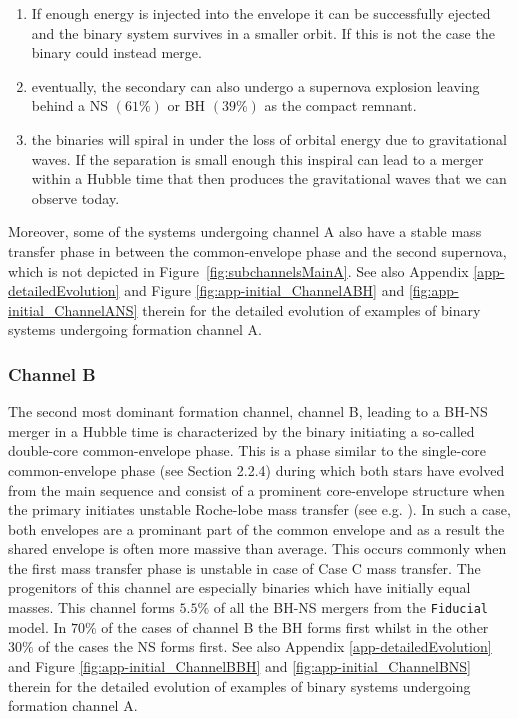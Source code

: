 \documentclass[a4paper,fleqn,usenatbib,useAMS,usedcolumn]{mnras}
\newcommand\Fiducial{\texttt{Fiducial }}
\begin{document}
\begin{enumerate}
	\item If enough energy is injected into the envelope it can be successfully ejected and the binary system survives in a smaller orbit. If this is not the case the binary could instead merge.  
	\item eventually, the secondary can also undergo a supernova explosion leaving behind a NS $(61 \%)$ or BH $(39 \%)$ as the compact remnant. 
	\item the binaries will spiral in under the loss of orbital energy due to gravitational waves. If the separation is small enough this inspiral can lead to a merger within a Hubble time that then produces the gravitational waves that we can observe today. 
\end{enumerate}

Moreover, some of the systems undergoing channel A also have a stable mass transfer phase in between the common-envelope phase and the second supernova, which is not depicted in Figure~\ref{fig:subchannelsMainA}. 
See also Appendix \ref{app-detailedEvolution}  and Figure \ref{fig:app-initial_ChannelABH} and \ref{fig:app-initial_ChannelANS} therein for the detailed evolution of examples of binary systems undergoing formation channel A.  \\





\subsubsection{Channel B}

The second most dominant formation channel, channel B, leading to a BH-NS merger in a Hubble time is characterized by the binary initiating a so-called double-core common-envelope phase. This is a phase similar to the single-core common-envelope phase (see Section 2.2.4) during which both stars have evolved from the main sequence and consist of a prominent core-envelope structure when the primary initiates unstable Roche-lobe mass transfer (see e.g. \citealt{1995ApJ...440..270B,Belczynski:2000wr, Dewi:2006bx}). In such a case, both envelopes are a prominant part of the common envelope and as a result the shared envelope is often more massive than average. This occurs commonly when the first mass transfer phase is unstable in case of Case C mass transfer. The progenitors of this channel are especially binaries  which have initially equal masses. This channel forms $5.5\%$ of all the BH-NS mergers from the \Fiducial model. 
 In   $70\%$ of the cases of channel B the BH forms first whilst in the other $30\%$ of the cases the NS forms first.  
See also Appendix \ref{app-detailedEvolution}  and Figure \ref{fig:app-initial_ChannelBBH} and \ref{fig:app-initial_ChannelBNS} therein for the detailed evolution of examples of binary systems undergoing formation channel A.  \\
\end{document}
